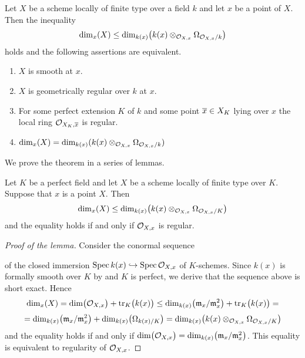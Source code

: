 \begin{theorem}\label{theorem:main_result_concerning_smoothness_over_a_field}
Let $X$ be a scheme locally of finite type over a field $k$ and let $x$ be a point of $X$. Then the inequality
$$\mathrm{dim}_x(X)\leq \mathrm{dim}_{k(x)}\big(k(x)\otimes_{{\mathcal O}_{X,x}}\Omega_{{\mathcal O}_{X,x}/k}\big)$$
holds and the following assertions are equivalent.
\begin{enumerate}[label=\emph{\textbf{(\roman*)}}, leftmargin=3.0em]
\item $X$ is smooth at $x$.
\item $X$ is geometrically regular over $k$ at $x$.
\item For some perfect extension $K$ of $k$ and some point $\overline{x}\in X_K$ lying over $x$ the local ring ${\mathcal O}_{X_K,\overline{x}}$ is regular.
\item $\mathrm{dim}_x(X) = \mathrm{dim}_{k(x)}(k(x)\otimes_{{\mathcal O}_{X,x}}\Omega_{{\mathcal O}_{X,x}/k})$ 
\end{enumerate}
\end{theorem}
\noindent
We prove the theorem in a series of lemmas.

\begin{lemma}\label{lemma:inequality_of_dimensions}
Let $K$ be a perfect field and let $X$ be a scheme locally of finite type over $K$. Suppose that $x$ is a point $X$. Then
$$\mathrm{dim}_x(X) \leq \mathrm{dim}_{k(x)}\big(k(x)\otimes_{{\mathcal O}_{X,x}}\Omega_{{\mathcal O}_{X,x}/K}\big)$$
and the equality holds if and only if ${\mathcal O}_{X,x}$ is regular.
\end{lemma}
\begin{proof}[Proof of the lemma]
Consider the conormal sequence
\begin{center}
\end{center}
of the closed immersion $\mathrm{Spec}\, k(x) \hookrightarrow \mathrm{Spec}\, {\mathcal O}_{X,x}$ of $K$-schemes. Since $k(x)$ is formally smooth over $K$ by {\cite[Corollary 6.4]{Formally_smooth_and_unramified}} and $K$ is perfect, we derive that the sequence above is short exact. Hence
$$\mathrm{dim}_x(X) = \mathrm{dim}\big({\mathcal O}_{X,x}\big) + \mathrm{tr}_K\big(k(x)\big) \leq \mathrm{dim}_{k(x)}\big(\mathfrak{m}_x/\mathfrak{m}^2_x\big) + \mathrm{tr}_K\big(k(x)\big) =$$
$$= \mathrm{dim}_{k(x)}\big(\mathfrak{m}_x/\mathfrak{m}^2_x\big) + \mathrm{dim}_{k(x)}\big(\Omega_{k(x)/K}\big) = \mathrm{dim}_{k(x)}\big(k(x)\otimes_{{\mathcal O}_{X,x}}\Omega_{{\mathcal O}_{X,x}/K}\big)$$
and the equality holds if and only if $\mathrm{dim}\big({\mathcal O}_{X,x}\big) = \mathrm{dim}_{k(x)}\big(\mathfrak{m}_x/\mathfrak{m}^2_x\big)$. This equality is equivalent to regularity of ${\mathcal O}_{X,x}$.
\end{proof}


